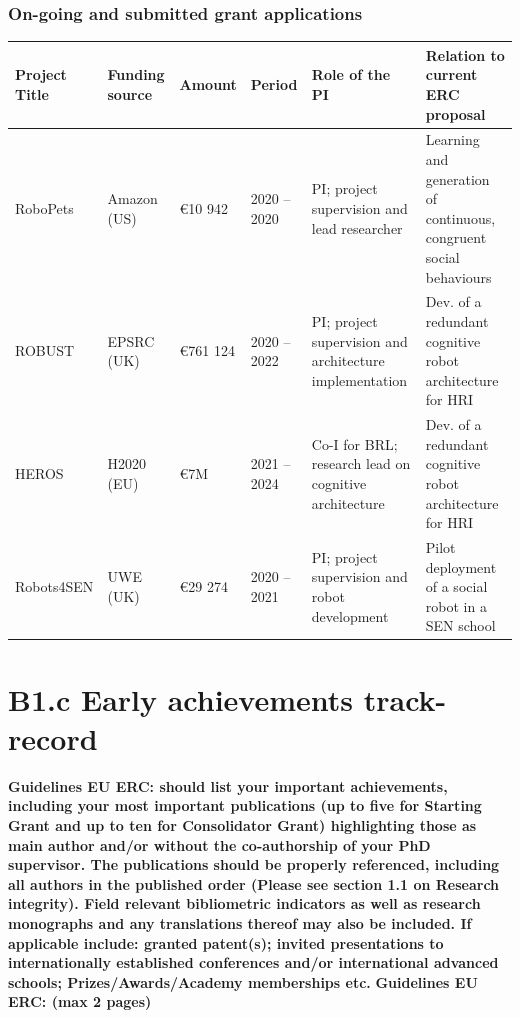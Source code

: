 \documentclass[11pt,a4paper]{report}
\newcommand{\eu}[1]{{\color{teal}\textbf{Guidelines EU ERC: #1}}}
\begin{document}
\subsection{On-going and submitted grant applications}

\begin{tabular}{llllp{4cm}p{4cm}}
\toprule
\textbf{Project Title} & \textbf{Funding source} & \textbf{Amount} & \textbf{Period} & \textbf{Role of the PI} & \textbf{Relation to current  ERC proposal} \\ \midrule
    RoboPets & Amazon (US) & €10 942 & 2020 -- 2020 & PI; project supervision and lead researcher & Learning and generation of continuous, congruent social behaviours \\ \midrule
    ROBUST & EPSRC (UK) & €761 124 & 2020 -- 2022 & PI; project supervision and
    architecture implementation & Dev. of a redundant cognitive robot architecture for HRI \\ \midrule
    HEROS & H2020 (EU) & €7M & 2021 -- 2024 & Co-I for BRL; research
    lead on cognitive architecture & Dev. of a redundant cognitive robot architecture for HRI \\ \midrule
    Robots4SEN & UWE (UK) & €29 274 & 2020 -- 2021 & PI; project supervision and robot development & Pilot deployment of a social robot in a SEN school \\ \bottomrule
\end{tabular}




\newpage
\chapter{B1.c Early achievements track-record}\label{early-achievements-track-record}

\eu{should list your important achievements,
including your most important publications (up to five for Starting Grant and up to ten for
Consolidator Grant) highlighting those as main author and/or without the co-authorship of your PhD
supervisor. The publications should be properly referenced, including all authors in the published
order (Please see section 1.1 on Research integrity). Field relevant bibliometric indicators as well as
research monographs and any translations thereof may also be included. If applicable include:
granted patent(s); invited presentations to internationally established conferences and/or
international advanced schools; Prizes/Awards/Academy memberships etc.}
\eu{(max 2 pages)}
\end{document}
